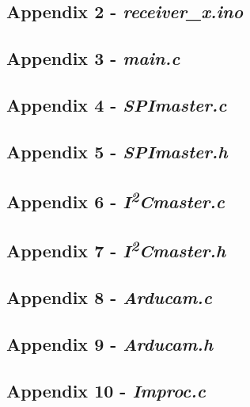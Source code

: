 \subsection{Appendix 2 - \textit{receiver\_x.ino}}\label{A2}

\newpage

\subsection{Appendix 3 - \textit{main.c}}\label{A3}

\newpage

\subsection{Appendix 4 - \textit{SPImaster.c}}\label{A4}

\newpage

\subsection{Appendix 5 - \textit{SPImaster.h}}\label{A5}

\newpage

\subsection{Appendix 6 - \textit{I\textsuperscript{2}Cmaster.c}}\label{A6}

\newpage

\subsection{Appendix 7 - \textit{I\textsuperscript{2}Cmaster.h}}\label{A7}

\newpage

\subsection{Appendix 8 - \textit{Arducam.c}}\label{A8}

\newpage

\subsection{Appendix 9 - \textit{Arducam.h}}\label{A9}


\newpage
\subsection{Appendix 10 - \textit{Improc.c}}\label{A10}

\newpage

